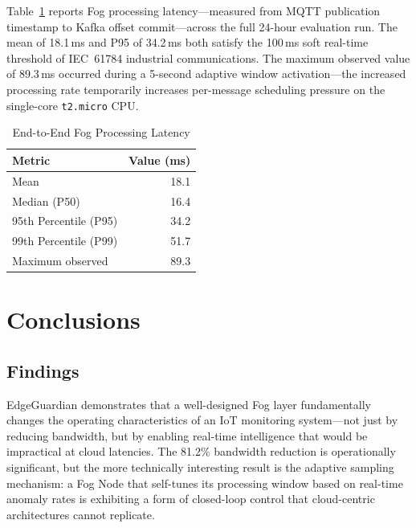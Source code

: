 \documentclass[conference]{IEEEtran}
\begin{document}
Table~\ref{tab:latency} reports Fog processing latency---measured from MQTT
publication timestamp to Kafka offset commit---across the full 24-hour
evaluation run. The mean of 18.1\,ms and P95 of 34.2\,ms both satisfy the
100\,ms soft real-time threshold of IEC~61784 industrial communications.
The maximum observed value of 89.3\,ms occurred during a 5-second adaptive
window activation---the increased processing rate temporarily increases
per-message scheduling pressure on the single-core \texttt{t2.micro} CPU.

\begin{table}[H]
  \caption{End-to-End Fog Processing Latency}
  \label{tab:latency}
  \centering
  \renewcommand{\arraystretch}{1.2}
  \begin{tabular}{l r}
    \toprule
    \textbf{Metric}        & \textbf{Value (ms)} \\
    \midrule
    Mean                   & 18.1                \\
    Median (P50)           & 16.4                \\
    95th Percentile (P95)  & 34.2                \\
    99th Percentile (P99)  & 51.7                \\
    Maximum observed       & 89.3                \\
    \bottomrule
  \end{tabular}
\end{table}

\section{Conclusions}
\label{sec:conclusion}

\subsection{Findings}

EdgeGuardian demonstrates that a well-designed Fog layer fundamentally
changes the operating characteristics of an IoT monitoring system---not
just by reducing bandwidth, but by enabling real-time intelligence that
would be impractical at cloud latencies. The 81.2\% bandwidth reduction
is operationally significant, but the more technically interesting result
is the adaptive sampling mechanism: a Fog Node that self-tunes its
processing window based on real-time anomaly rates is exhibiting a form
of closed-loop control that cloud-centric architectures cannot replicate.
\end{document}
